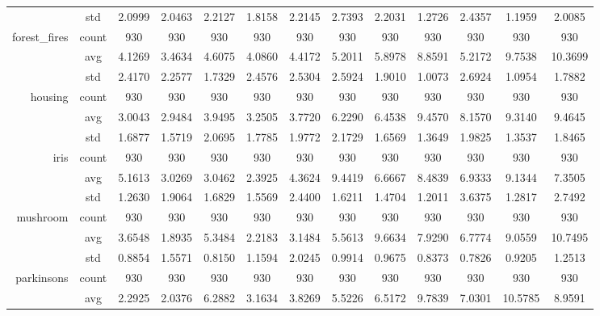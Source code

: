 \begin{table}[htbp]
{\begin{tabular}{rcccccccccccc}
          & std   & 2.0999 & 2.0463 & 2.2127 & 1.8158 & 2.2145 & 2.7393 & 2.2031 & 1.2726 & 2.4357 & 1.1959 & 2.0085 \\
    forest\_fires & count & 930   & 930   & 930   & 930   & 930   & 930   & 930   & 930   & 930   & 930   & 930 \\
          & avg   & 4.1269 & \cellcolor[rgb]{ .776,  .937,  .808}\textcolor[rgb]{ 0,  .38,  0}{3.4634} & 4.6075 & 4.0860 & 4.4172 & 5.2011 & 5.8978 & 8.8591 & 5.2172 & 9.7538 & 10.3699 \\
          & std   & 2.4170 & 2.2577 & 1.7329 & 2.4576 & 2.5304 & 2.5924 & 1.9010 & 1.0073 & 2.6924 & 1.0954 & 1.7882 \\
    housing & count & 930   & 930   & 930   & 930   & 930   & 930   & 930   & 930   & 930   & 930   & 930 \\
          & avg   & 3.0043 & \cellcolor[rgb]{ .776,  .937,  .808}\textcolor[rgb]{ 0,  .38,  0}{2.9484} & 3.9495 & 3.2505 & 3.7720 & 6.2290 & 6.4538 & 9.4570 & 8.1570 & 9.3140 & 9.4645 \\
          & std   & 1.6877 & 1.5719 & 2.0695 & 1.7785 & 1.9772 & 2.1729 & 1.6569 & 1.3649 & 1.9825 & 1.3537 & 1.8465 \\
    iris  & count & 930   & 930   & 930   & 930   & 930   & 930   & 930   & 930   & 930   & 930   & 930 \\
          & avg   & 5.1613 & 3.0269 & 3.0462 & \cellcolor[rgb]{ .776,  .937,  .808}\textcolor[rgb]{ 0,  .38,  0}{2.3925} & 4.3624 & 9.4419 & 6.6667 & 8.4839 & 6.9333 & 9.1344 & 7.3505 \\
          & std   & 1.2630 & 1.9064 & 1.6829 & 1.5569 & 2.4400 & 1.6211 & 1.4704 & 1.2011 & 3.6375 & 1.2817 & 2.7492 \\
    mushroom & count & 930   & 930   & 930   & 930   & 930   & 930   & 930   & 930   & 930   & 930   & 930 \\
          & avg   & 3.6548 & \cellcolor[rgb]{ .776,  .937,  .808}\textcolor[rgb]{ 0,  .38,  0}{1.8935} & 5.3484 & 2.2183 & 3.1484 & 5.5613 & 9.6634 & 7.9290 & 6.7774 & 9.0559 & 10.7495 \\
          & std   & 0.8854 & 1.5571 & 0.8150 & 1.1594 & 2.0245 & 0.9914 & 0.9675 & 0.8373 & 0.7826 & 0.9205 & 1.2513 \\
    parkinsons & count & 930   & 930   & 930   & 930   & 930   & 930   & 930   & 930   & 930   & 930   & 930 \\
          & avg   & 2.2925 & \cellcolor[rgb]{ .776,  .937,  .808}\textcolor[rgb]{ 0,  .38,  0}{2.0376} & 6.2882 & 3.1634 & 3.8269 & 5.5226 & 6.5172 & 9.7839 & 7.0301 & 10.5785 & 8.9591 \\

\end{tabular}}
\end{table}
